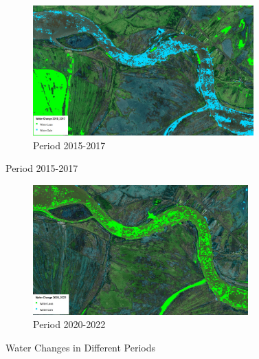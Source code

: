 \begin{figure}[H]
    \centering
    \begin{subfigure}[b]{0.6\textwidth}
        \includegraphics[width=\linewidth, height=5cm]{figures/ch5/2015-2017.jpg}
        \caption{Period 2015-2017}
        \label{fig:Period 2015-2017}
    \end{subfigure}
\end{figure}

\begin{figure}[H]
    \centering
    \begin{subfigure}[c]{0.6\textwidth}
        \includegraphics[width=\linewidth, height=5cm]{figures/ch5/2020-2022.jpg}
        \caption{Period 2020-2022}
        \label{fig:Period 2020-2022}
    \end{subfigure}
    
    \caption{Water Changes in Different Periods}
    \label{fig:Water Changes}
\end{figure}

